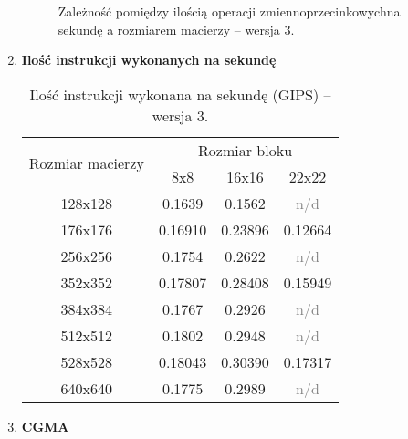 \begin{enumerate}
\begin{figure}[H]
%
\caption{Zależność pomiędzy ilością operacji zmiennoprzecinkowychna sekundę a rozmiarem macierzy -- wersja 3.}
\end{figure}

\item \textbf{Ilość instrukcji wykonanych na sekundę} \newline

\begin{table}[H]
\centering
\begin{tabular}{|c|c|c|c|}
\hline
\multirow{2}{*}{Rozmiar macierzy} & \multicolumn{3}{c|}{Rozmiar bloku} \\ \cline{2-4}
& 8x8 & 16x16 & 22x22 \\ \hline
128x128 & 0.1639 & 0.1562 & \textcolor{gray}{n/d}\\ \hline
176x176 & 0.16910 & 0.23896 & 0.12664 \\ \hline
256x256 & 0.1754 & 0.2622 & \textcolor{gray}{n/d} \\ \hline
352x352 & 0.17807 & 0.28408 & 0.15949 \\ \hline
384x384 & 0.1767 & 0.2926 & \textcolor{gray}{n/d} \\ \hline
512x512 & 0.1802 & 0.2948 & \textcolor{gray}{n/d} \\ \hline
528x528 & 0.18043 & 0.30390 & 0.17317 \\ \hline
640x640 & 0.1775 & 0.2989 & \textcolor{gray}{n/d} \\ \hline
\end{tabular}
\caption{Ilość instrukcji wykonana na sekundę (GIPS) -- wersja 3.}
\end{table}

\item \textbf{CGMA} \newline


\end{enumerate}
